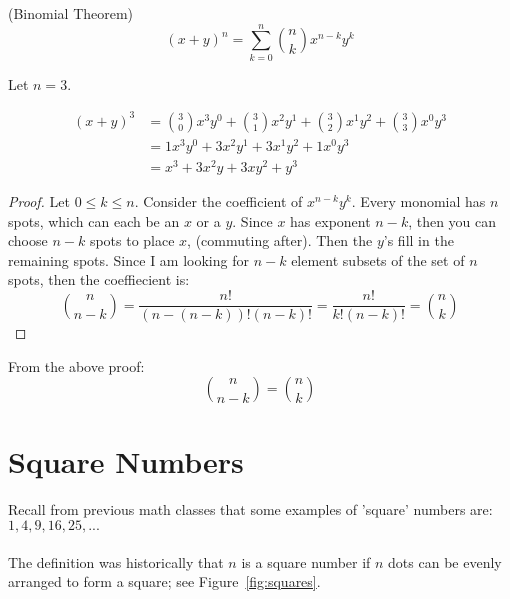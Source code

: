 \begin{theorem} (Binomial Theorem)\\
$$ (x + y)^{n} = \sum_
{k=0}^{n}
{\binom{n}{k}} x^{n-k} y^{k}
$$\end{theorem}

\begin{example}
Let $n=3$.

\begin{align*}
(x + y)^3 &= \binom{3}{0}x^{3}y^{0} + \binom{3}{1}x^{2}y^{1} + \binom{3}{2}x^{1}y^{2} + \binom{3}{3}x^{0}y^{3}\\
&= 1x^{3}y^{0} + 3x^{2}y^{1} + 3x^{1}y^{2} + 1x^{0}y^{3}\\ 
&= x^{3} + 3x^{2}y + 3xy^{2} + y^{3}
\end{align*}
\end{example}


\begin{proof}
Let ${0}\leq{k}\leq{n}$. Consider the coefficient of $x^{n-k}y^{k}$. Every monomial has $n$ spots, which can each be an $x$ or a $y$. Since $x$ has exponent $n-k$, then you can choose $n-k$ spots to place $x$, (commuting after). Then the $y$'s fill in the remaining spots. Since I am looking for $n-k$ element subsets of the set of $n$ spots, then the coeffiecient is: 
$$\binom{n}{n-k} = \frac{n!}{(n-(n-k))!(n-k)!} = \frac{n!}{k!(n-k)!} = \binom{n}{k}$$
\end{proof}

\begin{proposition} From the above proof:\\
$$\binom{n}{n-k} = \binom{n}{k}$$\end{proposition}

\section{Square Numbers}

Recall from previous math classes that some examples of 'square' numbers are: $1, 4, 9, 16, 25, ...$ 
\\\\The definition was historically that $n$ is a square number if $n$ dots can be evenly arranged to form a square; see Figure~\ref{fig:squares}.

